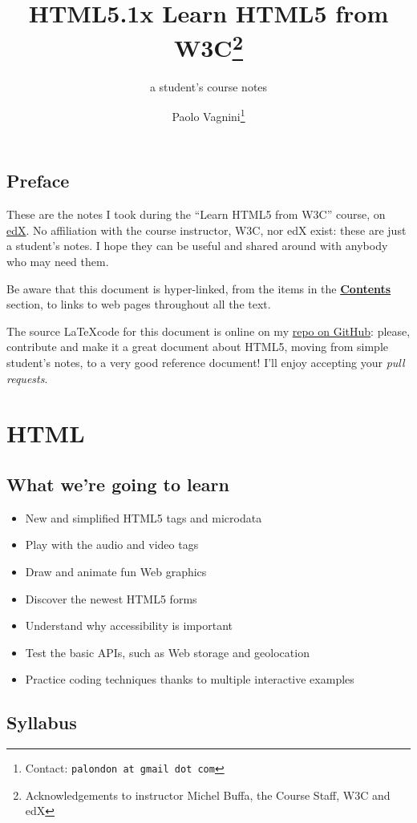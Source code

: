 \documentclass[a4paper,11pt]{book}
\title{HTML5.1x Learn HTML5 from W3C\thanks{Acknowledgements to
instructor Michel Buffa, the Course Staff, W3C and edX}}
\subtitle{a student's course notes}
\author{Paolo Vagnini\thanks{Contact: \texttt{palondon at gmail dot com}}}
\begin{document}
\maketitle
\hypertarget{toc}{} \tableofcontents

\chapter*{Preface}
These are the notes I took during the ``Learn HTML5 from W3C'' course,
on \href{http://www.edx.org}{edX}. No affiliation with the course instructor,
W3C, nor edX exist: these are just a student's notes.
I hope they can be useful and shared around with anybody who may need them.

Be aware that this document is hyper-linked, from the items in the
\hyperlink{toc}{\textbf{Contents}} section,
to links to web pages throughout all the text.

The source \LaTeX code for this document is online on my
\href{https://github.com/Pvag/HTML5_notes}{repo on GitHub}:
please, contribute and make it a great document about HTML5, moving from
simple student's notes, to a very good reference document! I'll enjoy
accepting your \textit{pull requests}.

\part{HTML}

\chapter{What we're going to learn}
\begin{itemize}
    \item New and simplified HTML5 tags and microdata
    \item Play with the audio and video tags
    \item Draw and animate fun Web graphics
    \item Discover the newest HTML5 forms
    \item Understand why accessibility is important
    \item Test the basic APIs, such as Web storage and geolocation
    \item Practice coding techniques thanks to multiple interactive examples
\end{itemize}

\chapter{Syllabus}
\end{document}
